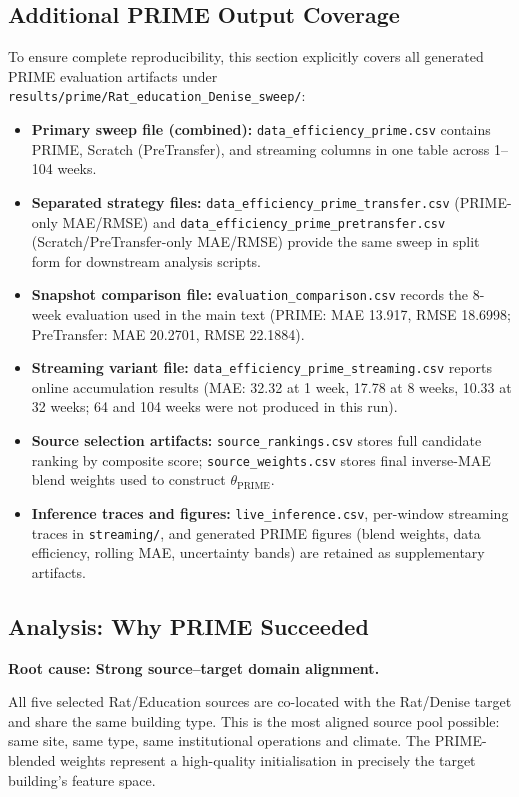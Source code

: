 \documentclass[12pt,a4paper]{report}
\begin{document}
\subsection{Additional PRIME Output Coverage}

To ensure complete reproducibility, this section explicitly covers all generated PRIME evaluation artifacts under \texttt{results/prime/Rat\_education\_Denise\_sweep/}:

\begin{itemize}
    \item \textbf{Primary sweep file (combined):} \texttt{data\_efficiency\_prime.csv} contains PRIME, Scratch (PreTransfer), and streaming columns in one table across 1--104 weeks.
    \item \textbf{Separated strategy files:} \texttt{data\_efficiency\_prime\_transfer.csv} (PRIME-only MAE/RMSE) and \texttt{data\_efficiency\_prime\_pretransfer.csv} (Scratch/PreTransfer-only MAE/RMSE) provide the same sweep in split form for downstream analysis scripts.
    \item \textbf{Snapshot comparison file:} \texttt{evaluation\_comparison.csv} records the 8-week evaluation used in the main text (PRIME: MAE 13.917, RMSE 18.6998; PreTransfer: MAE 20.2701, RMSE 22.1884).
    \item \textbf{Streaming variant file:} \texttt{data\_efficiency\_prime\_streaming.csv} reports online accumulation results (MAE: 32.32 at 1 week, 17.78 at 8 weeks, 10.33 at 32 weeks; 64 and 104 weeks were not produced in this run).
    \item \textbf{Source selection artifacts:} \texttt{source\_rankings.csv} stores full candidate ranking by composite score; \texttt{source\_weights.csv} stores final inverse-MAE blend weights used to construct $\theta_{\text{PRIME}}$.
    \item \textbf{Inference traces and figures:} \texttt{live\_inference.csv}, per-window streaming traces in \texttt{streaming/}, and generated PRIME figures (blend weights, data efficiency, rolling MAE, uncertainty bands) are retained as supplementary artifacts.
\end{itemize}

\subsection{Analysis: Why PRIME Succeeded}

\textbf{Root cause: Strong source--target domain alignment.}

All five selected Rat/Education sources are co-located with the Rat/Denise target and share the same building type. This is the most aligned source pool possible: same site, same type, same institutional operations and climate. The PRIME-blended weights represent a high-quality initialisation in precisely the target building's feature space.
\end{document}
